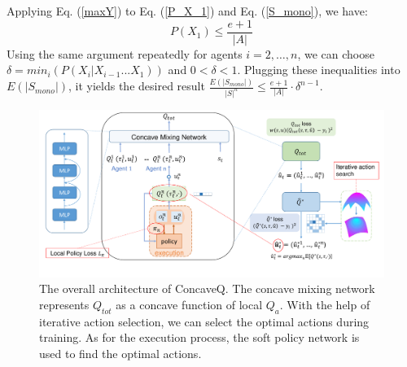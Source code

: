 {Applying Eq. (\ref{maxY}) to Eq. (\ref{P_X_1}) and Eq. (\ref{S_mono}), we have:
\begin{equation}
P(X_1) \leq \frac{e+1}{|A|}
\end{equation}
Using the same argument repeatedly for agents $i=2,\ldots,n$, we can choose $\delta = min_i(P(X_i|X_{i-1}...X_1))$ and $0 < \delta < 1$. Plugging these inequalities into $ E(|S_{mono}|) $, it yields the desired result $\frac{E(|S_{mono}|)}{|S|^n} \leq \frac{e+1}{|A|}\cdot \delta^{n-1}$.

\begin{figure}[ht!]
\centering
\includegraphics[scale=0.4]{new_figure/framework_v8.pdf}
\caption{The overall architecture of ConcaveQ. The concave mixing network represents $Q_{tot}$ as a concave function of local $Q_a$. With the help of iterative action selection, we can select the optimal actions during training. As for the execution process, the soft policy network is used to find the optimal actions. }
\label{framework}
\end{figure}


}
